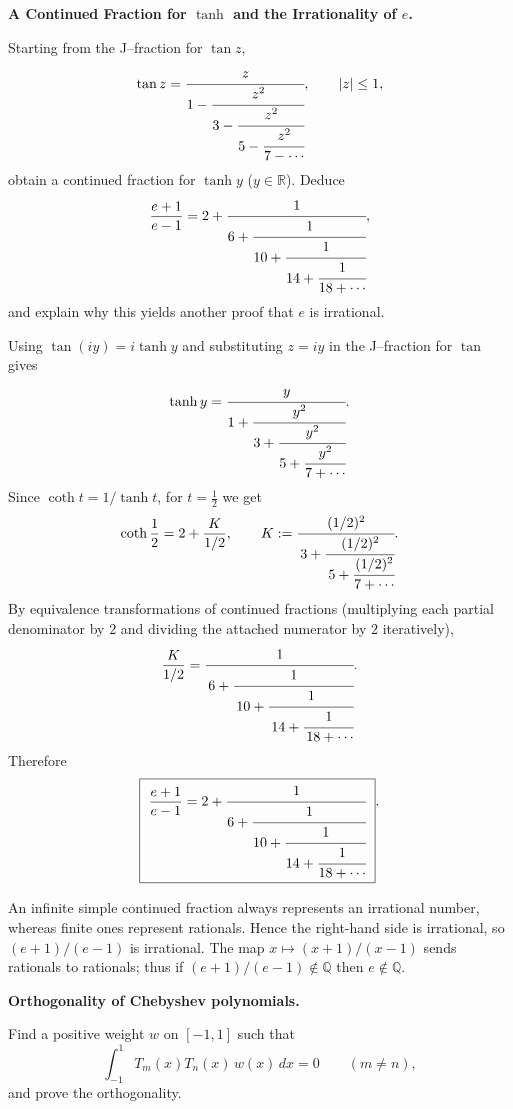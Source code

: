\begin{problem}[CP-II-0198]
\label{prob:cp-ii-0198}
\textbf{A Continued Fraction for \(\tanh\) and the Irrationality of \(e\).}

	Starting from the J--fraction for $\tan z$,
	\[
	\tan z=\cfrac{z}{\displaystyle 1-\cfrac{z^{2}}{\displaystyle 3-\cfrac{z^{2}}{\displaystyle 5-\cfrac{z^{2}}{7-\cdots}}}},\qquad |z|\le1,
	\]
	obtain a continued fraction for $\tanh y$ ($y\in\mathbb R$). Deduce
	\[
	\frac{e+1}{e-1}
	=2+\cfrac{1}{\displaystyle 6+\cfrac{1}{\displaystyle 10+\cfrac{1}{\displaystyle 14+\cfrac{1}{\displaystyle 18+\cdots}}}},
	\]
	and explain why this yields another proof that $e$ is irrational.
\end{problem}

\begin{solution}
Using $\tan(i y)=i\tanh y$ and substituting $z=iy$ in the J--fraction for $\tan$ gives
	\[
	\tanh y
	=\cfrac{y}{\displaystyle 1+\cfrac{y^{2}}{\displaystyle 3+\cfrac{y^{2}}{\displaystyle 5+\cfrac{y^{2}}{7+\cdots}}}}.
	\]
	Since $\coth t=1/\tanh t$, for $t=\tfrac12$ we get
	\[
	\coth\frac12
	= 2+\frac{K}{1/2},\qquad
	K:=\cfrac{(1/2)^{2}}{\,3+\cfrac{(1/2)^{2}}{\,5+\cfrac{(1/2)^{2}}{7+\cdots}}}.
	\]
	By equivalence transformations of continued fractions (multiplying each partial
	denominator by $2$ and dividing the attached numerator by $2$ iteratively),
	\[
	\frac{K}{1/2}
	=\cfrac{1}{\,6+\cfrac{1}{\,10+\cfrac{1}{\,14+\cfrac{1}{\,18+\cdots}}}}.
	\]
	Therefore
	\[
	\boxed{\ \frac{e+1}{e-1}
		= 2+\cfrac{1}{\displaystyle 6+\cfrac{1}{\displaystyle 10+\cfrac{1}{\displaystyle 14+\cfrac{1}{\displaystyle 18+\cdots}}}}\ }.
	\]

	An infinite simple continued fraction always represents an irrational number,
	whereas finite ones represent rationals. Hence the right-hand side is irrational,
	so $(e+1)/(e-1)$ is irrational. The map $x\mapsto (x+1)/(x-1)$ sends rationals
	to rationals; thus if $(e+1)/(e-1)\notin\mathbb Q$ then $e\notin\mathbb Q$.
\end{solution}

\begin{problem}[CP-II-0216]
\label{prob:cp-ii-0216}
\textbf{Orthogonality of Chebyshev polynomials.}

\hspace*{1.5em}Find a positive weight $w$ on $[-1,1]$ such that
	\[
	\int_{-1}^{1} T_m(x)T_n(x)\,w(x)\,dx=0\qquad (m\ne n),
	\]
	and prove the orthogonality.
\end{problem}

